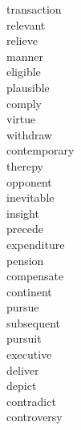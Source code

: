 \documentclass[a4paper, 10pt]{ctexart}
\begin{document}
\begin{multicols*}{2}
\begin{description}
\item[transaction]

\item[relevant]

\item[relieve]

\item[manner]

\item[eligible]

\item[plausible]

\item[comply]

\item[virtue]

\item[withdraw]

\item[contemporary]

\item[therepy]

\item[opponent]

\item[inevitable]

\item[insight]

\item[precede]

\item[expenditure]

\item[pension]

\item[compensate]

\item[continent]

\item[pursue]

\item[subsequent]

\item[pursuit]

\item[executive]

\item[deliver]

\item[depict]

\item[contradict]

\item[controversy]


\end{description}
\end{multicols*}
\end{document}
